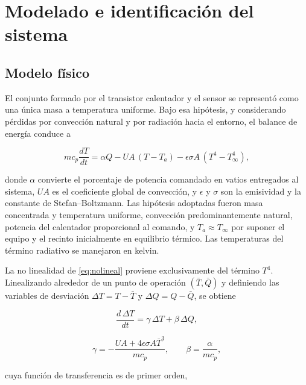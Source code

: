 \section{Modelado e identificación del sistema}

\subsection{Modelo físico}

El conjunto formado por el transistor calentador y el sensor se representó como una única masa a
temperatura uniforme. Bajo esa hipótesis, y considerando pérdidas por convección natural y por
radiación hacia el entorno, el balance de energía conduce a \cite{hedengren_modeling}

\begin{equation}
m c_p \frac{dT}{dt} = \alpha Q - UA\,(T - T_a) - \epsilon\sigma A\,(T^4 - T_\infty^4),
\label{eq:nolineal}
\end{equation}

donde $\alpha$ convierte el porcentaje de potencia comandado en vatios entregados al sistema, $UA$
es el coeficiente global de convección, y $\epsilon$ y $\sigma$ son la emisividad y la constante de
Stefan--Boltzmann. Las hipótesis adoptadas fueron masa concentrada y temperatura uniforme,
convección predominantemente natural, potencia del calentador proporcional al comando, y
$T_a \approx T_\infty$ por suponer el equipo y el recinto inicialmente en equilibrio térmico. Las
temperaturas del término radiativo se manejaron en kelvin.

La no linealidad de \eqref{eq:nolineal} proviene exclusivamente del término $T^4$. Linealizando
alrededor de un punto de operación $(\bar T, \bar Q)$ y definiendo las variables de desviación
$\Delta T = T - \bar T$ y $\Delta Q = Q - \bar Q$, se obtiene \cite{hedengren_linearize}

\begin{equation}
\frac{d\,\Delta T}{dt} = \gamma\,\Delta T + \beta\,\Delta Q,
\label{eq:lineal}
\end{equation}

\vspace{-3mm}
\begin{equation}
\gamma = -\frac{UA + 4\epsilon\sigma A \bar T^{3}}{m c_p},
\qquad
\beta = \frac{\alpha}{m c_p},
\label{eq:gammabeta}
\end{equation}

cuya función de transferencia es de primer orden,

